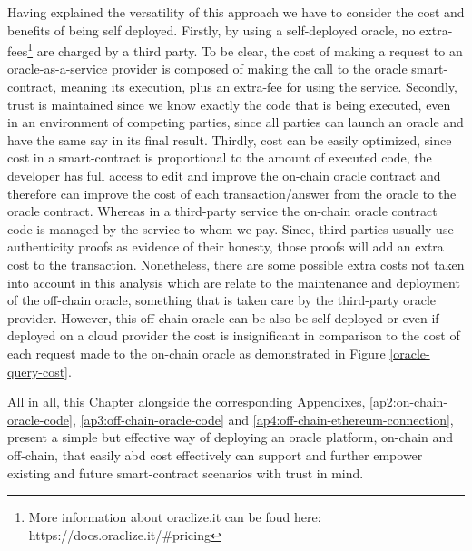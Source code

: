 Having explained the versatility of this approach we have to consider the cost and benefits of being self deployed. Firstly, by using a self-deployed oracle, no extra-fees\footnote{More information about oraclize.it can be foud here: https://docs.oraclize.it/\#pricing} are charged by a third party. To be clear, the cost of making a request to an oracle-as-a-service provider is composed of making the call to the oracle smart-contract, meaning its execution, plus an extra-fee for using the service. Secondly, trust is maintained since we know exactly the code that is being executed, even in an environment of competing parties, since all parties can launch an oracle and have the same say in its final result. Thirdly, cost can be easily optimized, since cost in a smart-contract is proportional to the amount of executed code, the developer has full access to edit and improve the on-chain oracle contract and therefore can improve the cost of each transaction/answer from the oracle to the oracle contract. Whereas in a third-party service the on-chain oracle contract code is managed by the service to whom we pay. Since, third-parties usually use authenticity proofs as evidence of their honesty, those proofs will add an extra cost to the transaction. Nonetheless, there are some possible extra costs not taken into account in this analysis which are relate to the maintenance and deployment of the off-chain oracle, something that is taken care by the third-party oracle provider. However, this off-chain oracle can be also be self deployed or even if deployed on a cloud provider the cost is insignificant in comparison to the cost of each request made to the on-chain oracle as demonstrated in Figure \ref{oracle-query-cost}.

All in all, this Chapter alongside the corresponding Appendixes, \ref{ap2:on-chain-oracle-code}, \ref{ap3:off-chain-oracle-code} and \ref{ap4:off-chain-ethereum-connection}, present a simple but effective way of deploying an oracle platform, on-chain and off-chain, that easily abd cost effectively can support and further empower existing and future smart-contract scenarios with trust in mind.